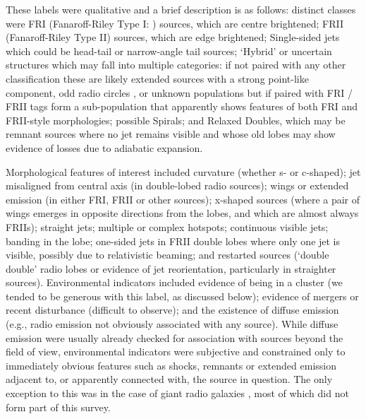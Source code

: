 \documentclass{aa}
\begin{document}
These labels were qualitative and a brief description is as follows: distinct classes were FRI (Fanaroff-Riley Type I: \citealt{fanaroff74}) sources, which are centre brightened; FRII (Fanaroff-Riley Type II) sources, which are edge brightened; Single-sided jets which could be head-tail or narrow-angle tail sources; `Hybrid' or uncertain structures which may fall into multiple categories: if not paired with any other classification these are likely extended sources with a strong point-like component, odd radio circles \cite[e.g.,][]{norris21}, or unknown populations but if paired with FRI / FRII tags form a sub-population that apparently shows features of both FRI and FRII-style morphologies; possible Spirals; and Relaxed Doubles, which may be remnant sources where no jet remains visible and whose old lobes may show evidence of losses due to adiabatic expansion. 

Morphological features of interest included curvature (whether s- or c-shaped); jet misaligned from central axis (in double-lobed radio sources); wings or extended emission (in either FRI, FRII or other sources); x-shaped sources (where a pair of wings emerges in opposite directions from the lobes, and which are almost always FRIIs); straight jets; multiple or complex hotspots; continuous visible jets; banding in the lobe; one-sided jets in FRII double lobes where only one jet is visible, possibly due to relativistic beaming; and restarted sources (`double double' radio lobes or evidence of jet reorientation, particularly in straighter sources). Environmental indicators included evidence of being in a cluster (we tended to be generous with this label, as discussed below); evidence of mergers or recent disturbance (difficult to observe); and the existence of diffuse emission (e.g., radio emission not obviously associated with any source). While diffuse emission were usually already checked for association with sources beyond the field of view, environmental indicators were subjective and constrained only to immediately obvious features such as shocks, remnants or extended emission adjacent to, or apparently connected with, the source in question. The only exception to this was in the case of giant radio galaxies \citep{oei23}, most of which did not form part of this survey.
\end{document}
